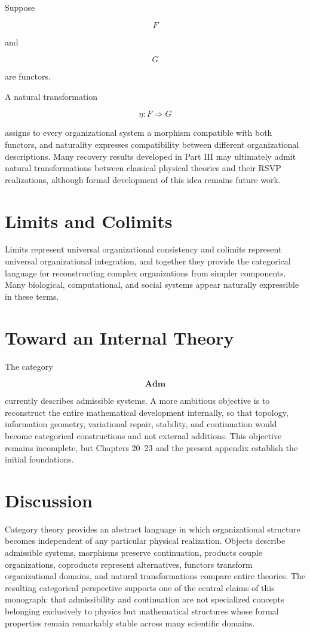 \documentclass[11pt,oneside]{book}
\numberwithin{equation}{chapter}
\theoremstyle{definition}
\theoremstyle{plain}
\begin{document}
Suppose

\[
F
\]

and

\[
G
\]

are functors.

A natural transformation

\[
\eta
:
F
\Rightarrow
G
\]

assigns to every organizational system a morphism compatible with both functors, and naturality expresses compatibility between different organizational descriptions. Many recovery results developed in Part III may ultimately admit natural transformations between classical physical theories and their RSVP realizations, although formal development of this idea remains future work.

\section{Limits and Colimits}

Limits represent universal organizational consistency and colimits represent universal organizational integration, and together they provide the categorical language for reconstructing complex organizations from simpler components. Many biological, computational, and social systems appear naturally expressible in these terms.

\section{Toward an Internal Theory}

The category

\[
\mathbf{Adm}
\]

currently describes admissible systems. A more ambitious objective is to reconstruct the entire mathematical development internally, so that topology, information geometry, variational repair, stability, and continuation would become categorical constructions and not external additions. This objective remains incomplete, but Chapters 20--23 and the present appendix establish the initial foundations.

\section{Discussion}

Category theory provides an abstract language in which organizational structure becomes independent of any particular physical realization. Objects describe admissible systems, morphisms preserve continuation, products couple organizations, coproducts represent alternatives, functors transform organizational domains, and natural transformations compare entire theories. The resulting categorical perspective supports one of the central claims of this monograph: that admissibility and continuation are not specialized concepts belonging exclusively to physics but mathematical structures whose formal properties remain remarkably stable across many scientific domains.
\end{document}
